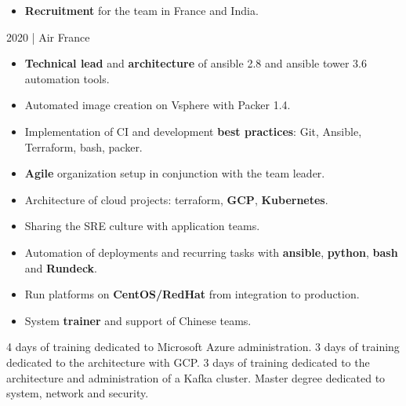\documentclass[
	a4paper,
	maincolor=cvartifakt,
	sidecolor=cvgray,
	sidebartextcolor=cvwhite,
	sectioncolor=cvartifakt,
	subsectioncolor=cvgray,
	sidebarwidth=0.36\paperwidth,
    topbottommargin=0.04\paperheight,
]{fortysecondscv}
\begin{document}
\begin{cvtable}[2]
{\begin{itemize}
				\item \textbf{Recruitment} for the team in France and India.
			\end{itemize}
	}
	{
		\textcolor{maincolor}{2020 | Air France}
		\begin{itemize}
			\item \textbf{Technical lead} and \textbf{architecture} of ansible 2.8 and ansible tower 3.6 automation tools.
			\item Automated image creation on Vsphere with Packer 1.4.
			\item Implementation of CI and development \textbf{best practices}: Git, Ansible, Terraform, bash, packer.
			\item \textbf{Agile} organization setup in conjunction with the team leader.
		\end{itemize}
	}
	{
		\vspace{-8pt}
		\begin{itemize}
			\item Architecture of cloud projects: terraform, \textbf{GCP}, \textbf{Kubernetes}.
			\item Sharing the SRE culture with application teams.
			\item Automation of deployments and recurring tasks with \textbf{ansible}, \textbf{python}, \textbf{bash} and \textbf{Rundeck}.
			\item Run platforms on \textbf{CentOS/RedHat} from integration to production.
			\item System \textbf{trainer} and support of Chinese teams.
		\end{itemize}
	}
\end{cvtable}

\begin{cvtable}[2]
		{4 days of training dedicated to Microsoft Azure administration.}
		{3 days of training dedicated to the architecture with GCP.}
		{3 days of training dedicated to the architecture and administration of a Kafka cluster.}
		{Master degree dedicated to system, network and security.}
\end{cvtable}

\vspace{-11pt}
\end{document}
